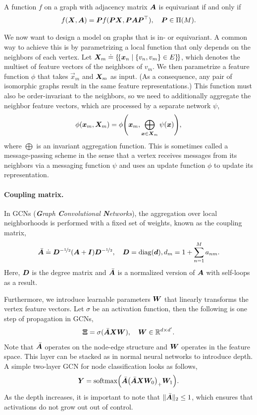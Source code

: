 \begin{definition}
    A function $f$ on a graph with adjacency matrix $\bm{A}$ is equivariant if and only if \[
        f(\bm{X}, \bm{A}) = \bm{P} f(\bm{P}\bm{X}, \bm{P}\bm{A}\bm{P}^\top), \quad \bm{P} \in \Pi(M).
    \]
\end{definition}

We now want to design a model on graphs that is in- or equivariant. A common way to achieve this is
by parametrizing a local function that only depends on the neighbors of each vertex. Let $\bm{X}_m
    \doteq \{\!\{ \bm{x}_n \mid \{ v_n, v_m \} \in E \}\!\}$, which denotes the multiset of feature
vectors of the neighbors of $v_m$. We then parametrize a feature function $\phi$ that takes
$\vec{x}_m$ and $\bm{X}_m$ as input. (As a consequence, any pair of isomorphic graphs result in
the same feature representations.) This function must also be order-invariant to the neighbors, so
we need to additionally aggregate the neighbor feature vectors, which are processed by a separate
network $\psi$, \[
    \phi(\vec{x}_m, \mat{X}_m) = \phi \lft( \vec{x}_m, \bigoplus_{\vec{x}\in \mat{X}_m} \psi(\vec{x}) \rgt),
\]
where $\bigoplus$ is an invariant aggregation function. This is sometimes called a message-passing
scheme in the sense that a vertex receives messages from its neighbors via a messaging function
$\psi$ and uses an update function $\phi$ to update its representation.

\paragraph{Coupling matrix.}

In GCNs (\textit{\textbf{G}raph \textbf{C}onvolutional \textbf{N}etworks}), the aggregation over
local neighborhoods is performed with a fixed set of weights, known as the coupling matrix, \[
    \bar{\bm{A}} \doteq \bm{D}^{-\nicefrac{1}{2}} (\bm{A} + \bm{I}) \bm{D}^{-\nicefrac{1}{2}}, \quad \bm{D} = \mathrm{diag}(\bm{d}), d_m = 1 + \sum_{n=1}^{M} a_{nm}.
\]
Here, $\bm{D}$ is the degree matrix and $\bar{\bm{A}}$ is a normalized version of $\bm{A}$ with
self-loops as a result.

Furthermore, we introduce learnable parameters $\bm{W}$ that linearly transforms the vertex
feature vectors. Let $\sigma$ be an activation function, then the following is one step of
propagation in GCNs, \[
    \bm{\Xi} = \sigma(\bar{\bm{A}} \bm{X} \bm{W}), \quad \bm{W} \in \mathbb{R}^{d \times d'}.
\]
Note that $\bar{\bm{A}}$ operates on the node-edge structure and $\bm{W}$ operates in the feature
space. This layer can be stacked as in normal neural networks to introduce depth. A simple
two-layer GCN for node classification looks as follows, \[
    \mat{Y} = \mathrm{softmax}\lft( \bar{\mat{A}} \lft( \bar{\mat{A}} \mat{X} \mat{W}_0 \rgt)_+ \mat{W}_1 \rgt).
\]
As the depth increases, it is important to note that $\| \bar{\bm{A}} \|_2 \leq 1$, which ensures
that activations do not grow out out of control.

